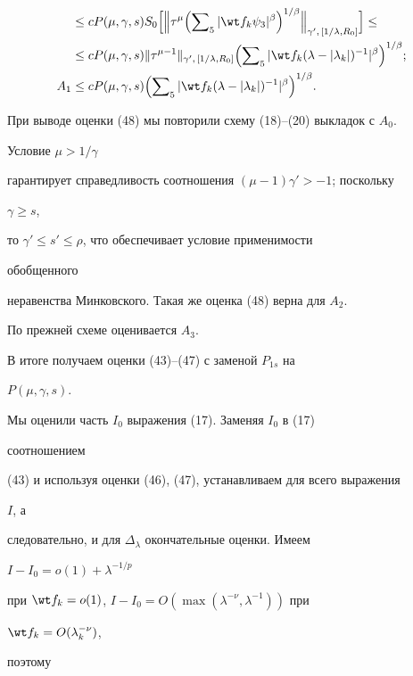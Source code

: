 {\begin{align}
%


&\le c P(\mu,\gamma,s)S_0\Bigl[\Bigl\|\tau^\mu\Bigl(


\sumn_5|\wt f_k\psi_3|^\beta\Bigr)^{1/\beta}


\Bigr\|_{\gamma',\,[1/\lambda,R_0]}\Bigr] \le\notag \\


&\le c P(\mu,\gamma,s)\|\tau^{\mu-1}


\|_{\gamma',\,[1/\lambda,R_0]}\Bigl(\sumn_5|\wt f_k


(\lambda-|\lambda_k|)^{-1}|^\beta\Bigr)^{1/\beta};\notag \\


A_1&\le c P(\mu,\gamma,s)\Bigl(\sumn_5|\wt f_k


(\lambda-|\lambda_k|)^{-1}|^\beta\Bigr)^{1/\beta}.


\end{align}


При выводе оценки (48) мы повторили схему (18)--(20) выкладок с $A_0$.


Условие $\mu>1/\gamma$


гарантирует справедливость соотношения $(\mu-1)\gamma'>-1$; поскольку


$\gamma\ge s$,


то $\gamma'\le s'\le\rho$, что обеспечивает условие применимости


обобщенного


неравенства Минковского. Такая же оценка (48) верна для $A_2$.


По прежней схеме оценивается $A_3$.


В итоге получаем оценки (43)--(47) с заменой $P_{1s}$ на


$P(\mu,\gamma,s)$.





Мы оценили часть $I_0$ выражения (17). Заменяя $I_0$ в (17)


соотношением


(43) и используя оценки (46), (47), устанавливаем для всего выражения


$I$, а


следовательно, и для $\Delta_\lambda$ окончательные оценки. Имеем


$I-I_0=o(1)+\lambda^{-1/p}$


при $\wt f_k=o(1)$, $I-I_0=O(\max(\lambda^{-\nu},\lambda^{-1}))$ при


$\wt f_k=O(\lambda^{-\nu}_k)$,


поэтому


}
